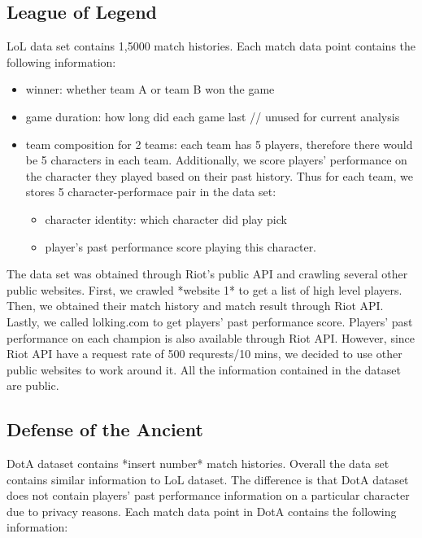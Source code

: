 \documentclass[conference]{IEEEtran}
\begin{document}
\subsection{League of Legend}
LoL data set contains 1,5000 match histories. Each match data point contains the following information:
\begin{itemize}
\item winner: whether team A or team B won the game
\item game duration: how long did each game last // unused for current analysis
\item team composition for 2 teams: each team has 5 players, therefore there would be 5 characters in each team. Additionally, we score players' performance on the character they played based on their past history. Thus for each team, we stores 5 character-performace pair in the data set:
	\begin{itemize}
	\item character identity: which character did play pick
	\item player's past performance score playing this character.
	\end{itemize}
\end{itemize}
The data set was obtained through Riot's public API and crawling several other public websites. First, we crawled *website 1* to get a list of high level players. Then, we obtained their match history and match result through Riot API. Lastly, we called lolking.com to get players' past performance score. Players' past performance on each champion is also available through Riot API. However, since Riot API have a request rate of 500 requrests/10 mins, we decided to use other public websites to work around it. All the information contained in the dataset are public.

\subsection{Defense of the Ancient}
DotA dataset contains *insert number* match histories. Overall the data set contains similar information to LoL dataset. The difference is that DotA dataset does not contain players' past performance information on a particular character due to privacy reasons. Each match data point in DotA contains the following information:
\end{document}
